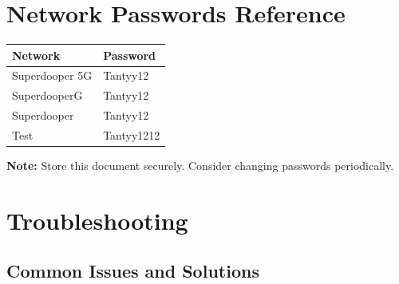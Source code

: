 \documentclass[11pt,letterpaper]{article}
\begin{document}
\section{Network Passwords Reference}

\begin{tcolorbox}[colback=red!5,colframe=red!50!black,title=Sensitive Information - Keep Secure]
\begin{tabular}{ll}
\textbf{Network} & \textbf{Password} \\
\midrule
Superdooper 5G & Tantyy12 \\
SuperdooperG & Tantyy12 \\
Superdooper & Tantyy12 \\
Test & Tantyy1212 \\
\end{tabular}

\vspace{0.5em}
\textbf{Note:} Store this document securely. Consider changing passwords periodically.
\end{tcolorbox}

\section{Troubleshooting}

\subsection{Common Issues and Solutions}
\end{document}
